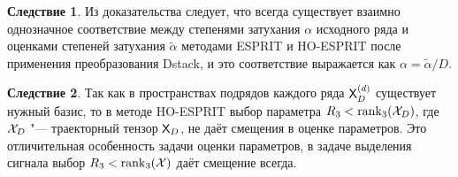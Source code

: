 \documentclass[12pt]{article}
\theoremstyle{plain}
\theoremstyle{definition}
\newtheorem*{corollary}{Следствие}
\theoremstyle{remark}
\begin{document}
\begin{corollary}
  Из доказательства следует, что всегда существует взаимно
  однозначное соответствие между степенями затухания $\alpha$ исходного ряда и
  оценками степеней затухания $\widetilde{\alpha}$ методами ESPRIT и
  HO-ESPRIT после применения преобразования Dstack,
  и это соответствие выражается как $\alpha = \widetilde{\alpha} / D$.
\end{corollary}
\begin{corollary}
  Так как в пространствах подрядов каждого ряда $\mathsf{X}_D^{(d)}$
  существует нужный базис, то в методе HO-ESPRIT выбор параметра $R_3
  < \operatorname{rank}_3(\mathcal{X}_D)$, где $\mathcal{X}_D$ "--- траекторный
  тензор $\mathsf{X}_D$, не даёт смещения в оценке параметров.
  Это отличительная особенность задачи оценки параметров, в
  задаче выделения сигнала выбор $R_3 < \operatorname{rank}_3(\mathcal{X})$ даёт
  смещение всегда.
\end{corollary}
\end{document}
